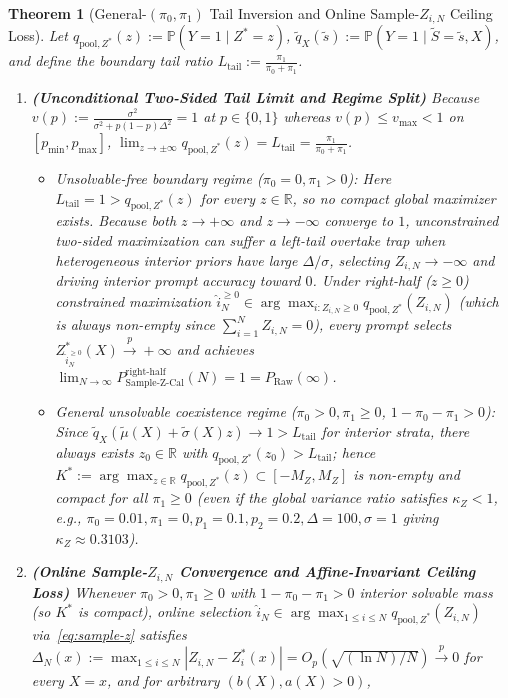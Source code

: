 \documentclass[10pt]{article}
\theoremstyle{plain}
\newtheorem{theorem}{Theorem}
\theoremstyle{definition}
\theoremstyle{remark}
\newcommand{\R}{\mathbb{R}}
\newcommand{\Prob}{\mathbb{P}}
\begin{document}
\begin{theorem}[General-$(\pi_0, \pi_1)$ Tail Inversion and Online Sample-$Z_{i,N}$ Ceiling Loss]
\label{thm:sample-z-ceiling}
Let $q_{\mathrm{pool}, Z^*}(z) := \Prob(Y = 1 \mid Z^* = z)$, $\tilde{q}_X(\tilde{s}) := \Prob(Y=1 \mid \tilde{S}=\tilde{s}, X)$, and define the boundary tail ratio $L_{\mathrm{tail}} := \frac{\pi_1}{\pi_0 + \pi_1}$.
\begin{enumerate}[leftmargin=1.6em,itemsep=2pt,topsep=1pt]
    \item \textbf{(Unconditional Two-Sided Tail Limit and Regime Split)} Because $v(p) := \frac{\sigma^2}{\sigma^2 + p(1-p)\Delta^2} = 1$ at $p \in \{0, 1\}$ whereas $v(p) \le v_{\max} < 1$ on $[p_{\min}, p_{\max}]$, $\lim_{z \to \pm\infty} q_{\mathrm{pool}, Z^*}(z) = L_{\mathrm{tail}} = \frac{\pi_1}{\pi_0 + \pi_1}$.
    \begin{itemize}[leftmargin=1.2em,itemsep=1pt,topsep=1pt]
        \item[(a)] \emph{Unsolvable-free boundary regime ($\pi_0 = 0, \pi_1 > 0$):} Here $L_{\mathrm{tail}} = 1 > q_{\mathrm{pool}, Z^*}(z)$ for every $z \in \R$, so no compact global maximizer exists. Because both $z \to +\infty$ and $z \to -\infty$ converge to $1$, unconstrained two-sided maximization can suffer a \emph{left-tail overtake trap} when heterogeneous interior priors have large $\Delta/\sigma$, selecting $Z_{i,N} \to -\infty$ and driving interior prompt accuracy toward $0$. Under right-half ($z \ge 0$) constrained maximization $\hat{i}_N^{\ge 0} \in \arg\max_{i : Z_{i,N} \ge 0} q_{\mathrm{pool}, Z^*}(Z_{i,N})$ (which is always non-empty since $\sum_{i=1}^N Z_{i,N} = 0$), every prompt selects $Z_{\hat{i}_N^{\ge 0}}^*(X) \xrightarrow{p} +\infty$ and achieves $\lim_{N\to\infty} P_{\mathrm{Sample\text{-}Z\text{-}Cal}}^{\mathrm{right\text{-}half}}(N) = 1 = P_{\mathrm{Raw}}(\infty)$.
        \item[(b)] \emph{General unsolvable coexistence regime ($\pi_0 > 0, \pi_1 \ge 0$, $1-\pi_0-\pi_1 > 0$):} Since $\tilde{q}_X(\tilde{\mu}(X) + \tilde{\sigma}(X)z) \to 1 > L_{\mathrm{tail}}$ for interior strata, there always exists $z_0 \in \R$ with $q_{\mathrm{pool}, Z^*}(z_0) > L_{\mathrm{tail}}$; hence $K^* := \arg\max_{z \in \R} q_{\mathrm{pool}, Z^*}(z) \subset [-M_Z, M_Z]$ is non-empty and compact for \emph{all} $\pi_1 \ge 0$ (even if the global variance ratio satisfies $\kappa_Z < 1$, e.g., $\pi_0=0.01, \pi_1=0, p_1=0.1, p_2=0.2, \Delta=100, \sigma=1$ giving $\kappa_Z \approx 0.3103$).
    \end{itemize}
    \item \textbf{(Online Sample-$Z_{i,N}$ Convergence and Affine-Invariant Ceiling Loss)} Whenever $\pi_0 > 0, \pi_1 \ge 0$ with $1 - \pi_0 - \pi_1 > 0$ interior solvable mass (so $K^*$ is compact), online selection $\hat{i}_N \in \arg\max_{1\le i\le N} q_{\mathrm{pool}, Z^*}(Z_{i,N})$ via~\eqref{eq:sample-z} satisfies $\Delta_N(x) := \max_{1 \le i \le N} |Z_{i,N} - Z_i^*(x)| = O_p(\sqrt{(\ln N)/N}) \xrightarrow{p} 0$ for every $X = x$, and for arbitrary $(b(X), a(X) > 0)$,

\end{enumerate}
\end{theorem}
\end{document}
